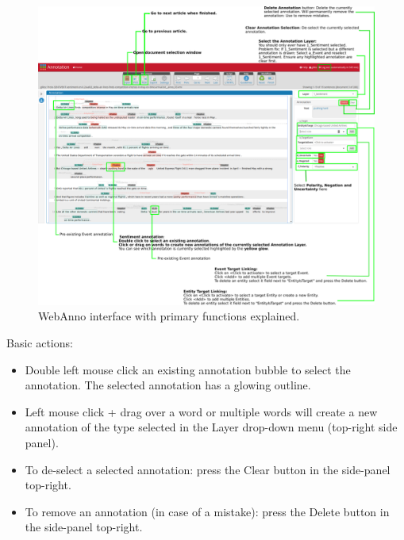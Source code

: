 \begin{figure}[!htb]
    \centering
    \includegraphics[width=\textwidth]{img/webanno-interface.pdf}
    \caption{WebAnno interface with primary functions explained.}
\end{figure}

\noindent
Basic actions:
\begin{itemize}[leftmargin=*]
    \item Double left mouse click an existing annotation bubble to select the annotation. The selected annotation has a glowing outline.
    \item Left mouse click + drag over a word or multiple words will create a new annotation of the type selected in the Layer drop-down menu (top-right side panel).
    \item To de-select a selected annotation: press the Clear button in the side-panel top-right.
    \item To remove an annotation (in case of a mistake): press the Delete button in the side-panel top-right.
    \
\end{itemize}